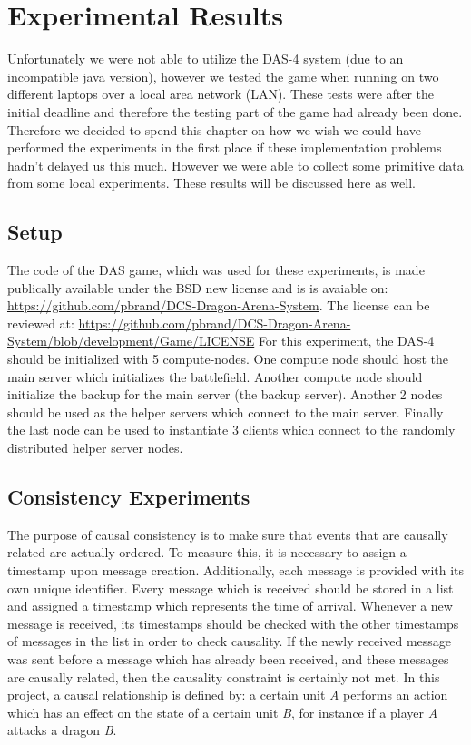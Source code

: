 \section{Experimental Results}
Unfortunately we were not able to utilize the DAS-4 system (due to an incompatible java version), however we tested the game when running on two different laptops over a local area network (LAN). These tests were after the initial deadline and therefore the testing part of the game had already been done. Therefore we decided to spend this chapter on how we wish we could have performed the experiments in the first place if these implementation problems hadn't delayed us this much. However we were able to collect some primitive data from some local experiments. These results will be discussed here as well.

\subsection{Setup}
The code of the DAS game, which was used for these experiments, is made publically available under the BSD new license and is
is avaiable on: \url{https://github.com/pbrand/DCS-Dragon-Arena-System}. 
The license can be reviewed at: \url{https://github.com/pbrand/DCS-Dragon-Arena-System/blob/development/Game/LICENSE}
For this experiment, the DAS-4 should be initialized with 5 compute-nodes. 
One compute node should host the main server which initializes the battlefield. 
Another compute node should initialize the backup for the main server (the backup server). 
Another 2 nodes should be used as the helper servers which connect to the main server. 
Finally the last node can be used to instantiate 3 clients which connect to the randomly distributed helper server nodes.

\subsection{Consistency Experiments}
The purpose of causal consistency is to make sure that events that are causally related are actually ordered. 
To measure this, it is necessary to assign a timestamp upon message creation. 
Additionally, each message is provided with its own unique identifier. 
Every message which is received should be stored in a list and assigned a timestamp which represents the time of arrival.
Whenever a new message is received, its timestamps should be checked with the other timestamps of messages in the list in order to check causality. If the newly received message was sent before a message which has already been received, and these messages are causally related, then the causality constraint is certainly not met.
In this project, a causal relationship is defined by: a certain unit \emph{A} performs an action which has an effect on the state of a certain unit \emph{B}, for instance if a player \emph{A} attacks a dragon \emph{B}.

